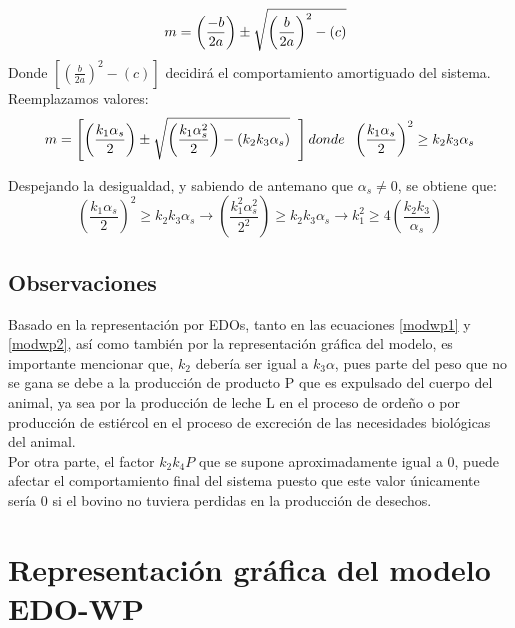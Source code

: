 \begin{equation}
    m=\left(\frac{-b}{2a}\right) \pm \sqrt{\left(\frac{b}{2a}\right)^{2}-(c)} \hspace{0.2cm}
\end{equation}
Donde $\left[\left(\frac{b}{2a}\right)^{2} - (c)\right]$ decidirá el comportamiento amortiguado del sistema. Reemplazamos valores:
\begin{equation}
    m=\left[\left(\frac{k_{1}\alpha_{s}}{2}\right)\pm\sqrt{\left(\frac{k_{1}\alpha_{s}^{2}}{2}\right)-(k_{2}k_{3}\alpha_{s})} \hspace{0.2cm}\right] donde \hspace{0.2cm} \left(\frac{k_{1}\alpha_{s}}{2}\right)^{2}\geq k_{2}k_{3}\alpha_{s} 
\end{equation}

Despejando la desigualdad, y sabiendo de antemano que 
 $\alpha_{s}\neq 0$, se obtiene que:
\begin{equation} \label{relacionkis}
    \left(\frac{k_{1}\alpha_{s}}{2}\right)^{2}\geq k_{2}k_{3}\alpha_{s} \longrightarrow \left(\frac{k_{1}^{2}\alpha_{s}^{2}}{2^{2}}\right)\geq k_{2}k_{3}\alpha_{s} \longrightarrow k_{1}^{2}\geq 4\left(\frac{k_{2}k_{3}}{\alpha_{s}}\right)
\end{equation}
\subsection{Observaciones}
Basado en la representación por EDOs, tanto en las ecuaciones \ref{modwp1} y \ref{modwp2}, así como también por la representación gráfica del modelo, es importante mencionar que, $k_{2}$ debería ser igual a $k_{3}\alpha$, pues parte del peso que no se gana se debe a la producción de producto P que es expulsado del cuerpo del animal, ya sea por la producción de leche L en el proceso de ordeño o por producción de estiércol en el proceso de excreción de las necesidades biológicas del animal. \\

Por otra parte, el factor $k_{2}k_{4}P$ que se supone aproximadamente igual a 0, puede afectar el comportamiento final del sistema puesto que este valor únicamente sería 0 si el bovino no tuviera perdidas en la producción de desechos.

\section{Representación gráfica del modelo EDO-WP}\label{grafolabel}

